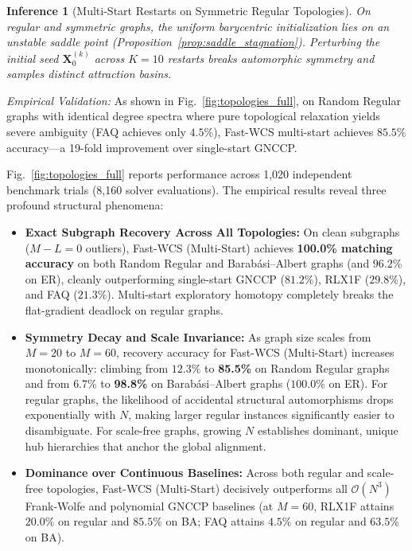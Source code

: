 \documentclass[conference]{IEEEtran}
\newtheorem{inference}{Inference}
\begin{document}
%

\begin{inference}[Multi-Start Restarts on Symmetric Regular Topologies]
\label{inf:restarts}
On regular and symmetric graphs, the uniform barycentric initialization lies on an unstable saddle point (Proposition~\ref{prop:saddle_stagnation}). Perturbing the initial seed $\mathbf{X}_0^{(k)}$ across $K=10$ restarts breaks automorphic symmetry and samples distinct attraction basins.
\end{inference}
\textit{Empirical Validation:} As shown in Fig.~\ref{fig:topologies_full}, on Random Regular graphs with identical degree spectra where pure topological relaxation yields severe ambiguity (FAQ achieves only $4.5\%$), Fast-WCS multi-start achieves $85.5\%$ accuracy—a 19-fold improvement over single-start GNCCP.

Fig.~\ref{fig:topologies_full} reports performance across 1,020 independent benchmark trials (8,160 solver evaluations). The empirical results reveal three profound structural phenomena:
\begin{itemize}
    \item \textbf{Exact Subgraph Recovery Across All Topologies:} On clean subgraphs ($M-L=0$ outliers), Fast-WCS (Multi-Start) achieves \textbf{100.0\% matching accuracy} on both Random Regular and Barab\'asi--Albert graphs (and $96.2\%$ on ER), cleanly outperforming single-start GNCCP ($81.2\%$), RLX1F ($29.8\%$), and FAQ ($21.3\%$). Multi-start exploratory homotopy completely breaks the flat-gradient deadlock on regular graphs.
    \item \textbf{Symmetry Decay and Scale Invariance:} As graph size scales from $M=20$ to $M=60$, recovery accuracy for Fast-WCS (Multi-Start) increases monotonically: climbing from $12.3\%$ to \textbf{85.5\%} on Random Regular graphs and from $6.7\%$ to \textbf{98.8\%} on Barab\'asi--Albert graphs ($100.0\%$ on ER). For regular graphs, the likelihood of accidental structural automorphisms drops exponentially with $N$, making larger regular instances significantly easier to disambiguate. For scale-free graphs, growing $N$ establishes dominant, unique hub hierarchies that anchor the global alignment.
    \item \textbf{Dominance over Continuous Baselines:} Across both regular and scale-free topologies, Fast-WCS (Multi-Start) decisively outperforms all $\mathcal{O}(N^3)$ Frank-Wolfe and polynomial GNCCP baselines (at $M=60$, RLX1F attains $20.0\%$ on regular and $85.5\%$ on BA; FAQ attains $4.5\%$ on regular and $63.5\%$ on BA).
\end{itemize}
\end{document}
